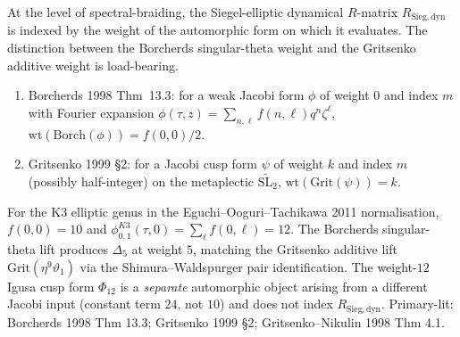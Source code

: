 \begin{remark}
\label{rem:sbf-borch-vs-grit}
At the level of spectral-braiding, the Siegel-elliptic dynamical
$R$-matrix $R_{\mathrm{Sieg,dyn}}$ is indexed by the weight of the
automorphic form on which it evaluates. The distinction between the
Borcherds singular-theta weight and the Gritsenko additive weight is
load-bearing.

\begin{enumerate}[label=\textup{(\roman*)}]
\item Borcherds 1998 Thm~13.3: for a weak Jacobi form $\phi$ of weight
$0$ and index $m$ with Fourier expansion
$\phi(\tau,z) = \sum_{n,\ell} f(n,\ell) q^n \zeta^\ell$,
$\mathrm{wt}(\mathrm{Borch}(\phi)) = f(0,0)/2$.
\item Gritsenko 1999 \S 2: for a Jacobi cusp form $\psi$ of weight $k$
and index $m$ (possibly half-integer) on the metaplectic
$\widetilde{\mathrm{SL}_2}$, $\mathrm{wt}(\mathrm{Grit}(\psi)) = k$.
\end{enumerate}

For the K3 elliptic genus in the Eguchi--Ooguri--Tachikawa 2011
normalisation, $f(0,0) = 10$ and
$\phi_{0,1}^{K3}(\tau, 0) = \sum_\ell f(0,\ell) = 12$. The Borcherds
singular-theta lift produces $\Delta_5$ at weight $5$, matching the
Gritsenko additive lift $\mathrm{Grit}(\eta^9\vartheta_1)$ via the
Shimura--Waldspurger pair identification. The weight-$12$ Igusa cusp
form $\Phi_{12}$ is a \emph{separate} automorphic object arising from
a different Jacobi input (constant term $24$, not $10$) and does not
index $R_{\mathrm{Sieg,dyn}}$. Primary-lit: Borcherds 1998 Thm 13.3;
Gritsenko 1999 \S 2; Gritsenko--Nikulin 1998 Thm 4.1.
\end{remark}

